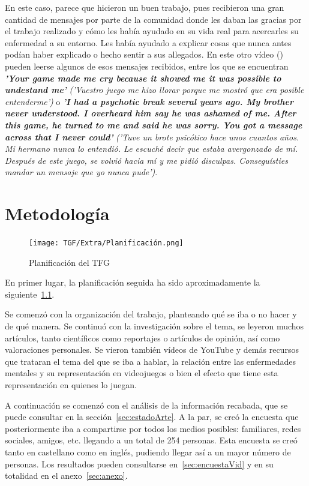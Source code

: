 \documentclass[12pt, a4paper,twoside,titlepage]{book}
\begin{document}
En este caso, parece que hicieron un buen trabajo, pues recibieron una gran cantidad de mensajes por parte de la comunidad donde les daban las gracias por el trabajo realizado y cómo les había ayudado en su vida real para acercarles su enfermedad a su entorno. Les había ayudado a explicar cosas que nunca antes podían haber explicado o hecho sentir a sus allegados. En este otro vídeo () pueden leerse algunos de esos mensajes recibidos, entre los que se encuentran \textbf{\textit{'Your game made me cry because it showed me it was possible to undestand me'}} \textit{('Vuestro juego me hizo llorar porque me mostró que era posible entenderme')} o \textbf{\textit{'I had a psychotic break several years ago. My brother never understood. I overheard him say he was ashamed of me. After this game, he turned to me and said he was sorry. You got a message across that I never could'}} \textit{('Tuve un brote psicótico hace unos cuantos años. Mi hermano nunca lo entendió. Le escuché decir que estaba avergonzado de mí. Después de este juego, se volvió hacia mí y me pidió disculpas. Conseguísties mandar un mensaje que yo nunca pude')}. 



\chapter{Metodología}


\begin{figure}
	\centering
	\texttt{[image: TGF/Extra/Planificación.png]}
	\caption{Planificación del TFG}
	\label{fig:planificacion}
\end{figure}


En primer lugar, la planificación seguida ha sido aproximadamente la siguiente~\ref{fig:planificacion}. 

Se comenzó con la organización del trabajo, planteando qué se iba o no hacer y de qué manera. Se continuó con la investigación sobre el tema, se leyeron muchos artículos, tanto científicos como reportajes o artículos de opinión, así como valoraciones personales. Se vieron también vídeos de YouTube y demás recursos que trataran el tema del que se iba a hablar, la relación entre las enfermedades mentales y su representación en videojuegos o bien el efecto que tiene esta representación en quienes lo juegan. 

A continuación se comenzó con el análisis de la información recabada, que se puede consultar en la sección~\ref{sec:estadoArte}. A la par, se creó la encuesta que posteriormente iba a compartirse por todos los medios posibles: familiares, redes sociales, amigos, etc. llegando a un total de 254 personas. Esta encuesta se creó tanto en castellano como en inglés, pudiendo llegar así a un mayor número de personas. Los resultados pueden consultarse en~\ref{sec:encuestaVid} y en su totalidad en el anexo~\ref{sec:anexo}. 
\end{document}
